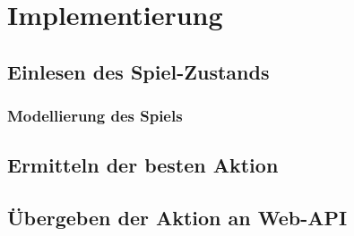 \chapter{Implementierung}
\label{ch:implementierung}


\section{Einlesen des Spiel-Zustands}
\label{sec:einlesen-spielzustand}

\subsection{Modellierung des Spiels}
\label{subsec:modellierung}


\section{Ermitteln der besten Aktion}
\label{sec:ermitteln-aktion}

\section{Übergeben der Aktion an Web-API}
\label{sec:uebergabe-aktion}